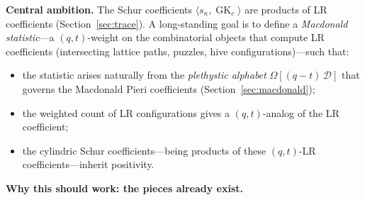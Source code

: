 \documentclass[11pt]{article}
\theoremstyle{plain}
\theoremstyle{definition}
\theoremstyle{remark}
\newcommand{\GK}{\operatorname{GK}}
\begin{document}
\textbf{Central ambition.}
The Schur coefficients
$\langle s_\kappa, \GK_c \rangle$ are products of
LR coefficients (Section~\ref{sec:trace}).
A long-standing goal is to define a \emph{Macdonald
statistic}---a $(q,t)$-weight on the combinatorial objects
that compute LR coefficients (intersecting lattice paths,
puzzles, hive configurations)---such that:
\begin{itemize}
\item the statistic arises naturally from the
  \emph{plethystic alphabet} $\Omega[(q-t)\,\mathcal{D}]$
  that governs the Macdonald Pieri coefficients
  (Section~\ref{sec:macdonald});
\item the weighted count of LR configurations gives a
  $(q,t)$-analog of the LR coefficient;
\item the cylindric Schur coefficients---being products of
  these $(q,t)$-LR coefficients---inherit positivity.
\end{itemize}

\medskip\noindent\textbf{Why this should work: the pieces already exist.}
\end{document}
